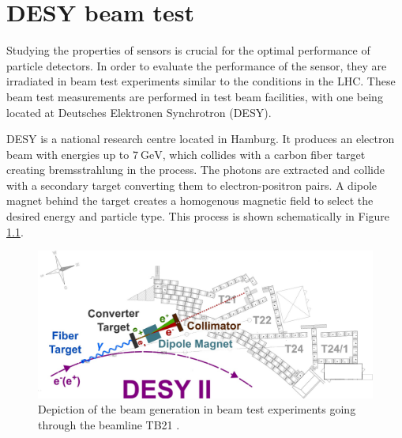 \chapter{DESY beam test}
Studying the properties of sensors is crucial for the optimal performance of particle detectors.
In order to evaluate the performance of the sensor, they are irradiated in beam test experiments similar to the conditions in the LHC.
These beam test measurements are performed in test beam facilities, with one being located at Deutsches Elektronen Synchrotron (DESY).

DESY is a national research centre located in Hamburg.
It produces an electron beam with energies up to
$\SI{7}{\GeV}$, which collides with a carbon fiber target creating bremsstrahlung in the process. The photons are extracted and collide with a secondary target
converting them to electron-positron pairs. A dipole magnet behind the target creates a homogenous magnetic field to select the desired energy and particle type. This process
is shown schematically in Figure \ref{fig:testbeam}.

\begin{figure}
  \centering
  \includegraphics[height=0.4\textwidth]{images/desy_modified.jpg}
  \caption{Depiction of the beam generation in beam test experiments going through the beamline TB21 \cite{testbeam}.}
  \label{fig:testbeam}
\end{figure}

